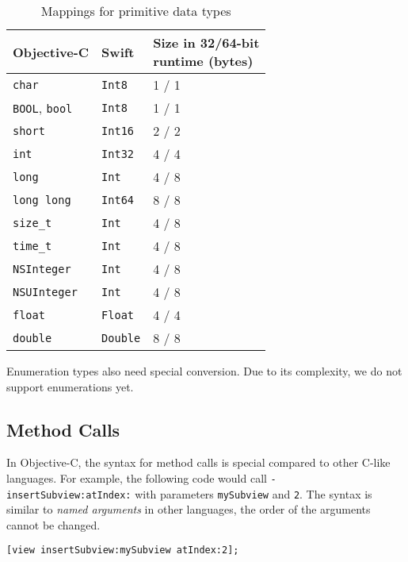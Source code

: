 \documentclass{sfuthesis}
\begin{document}
\begin{table}[H]
\begin{center}
\begin{tabular}{|l|l|l|}
\hline
{\bf Objective-C \cite{objcdatatypes}} & {\bf Swift \cite{swiftdatatypes}} & \specialcell{{\bf Size in 32/64-bit}\\{\bf runtime (bytes)}} \\
\hline
\texttt{char}       & \texttt{Int8}   & 1 / 1 \\
\texttt{BOOL}, \texttt{bool} & \texttt{Int8}   & 1 / 1 \\
\texttt{short}      & \texttt{Int16}  & 2 / 2 \\
\texttt{int}        & \texttt{Int32}  & 4 / 4 \\
\texttt{long}       & \texttt{Int}    & 4 / 8 \\
\texttt{long long}  & \texttt{Int64}  & 8 / 8 \\
\texttt{size\_t}    & \texttt{Int}    & 4 / 8 \\
\texttt{time\_t}    & \texttt{Int}    & 4 / 8 \\
\texttt{NSInteger}  & \texttt{Int}    & 4 / 8 \\
\texttt{NSUInteger} & \texttt{Int}    & 4 / 8 \\
\texttt{float}      & \texttt{Float}  & 4 / 4 \\
\texttt{double}     & \texttt{Double} & 8 / 8 \\
\hline
\end{tabular}
\end{center}
\caption{Mappings for primitive data types}
\end{table}

Enumeration types also need special conversion. Due to its complexity, we do not support enumerations yet.

\subsection{Method Calls}

In Objective-C, the syntax for method calls is special compared to other C-like languages. For example, the following code would call \texttt{- insertSubview:atIndex:} with parameters \texttt{mySubview} and \texttt{2}. The syntax is similar to \emph{named arguments} in other languages, the order of the arguments cannot be changed.

\begin{verbatim}
[view insertSubview:mySubview atIndex:2];
\end{verbatim}
\end{document}

